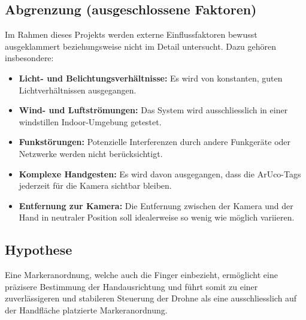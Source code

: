 \subsection{Abgrenzung (ausgeschlossene Faktoren)}
Im Rahmen dieses Projekts werden externe Einflussfaktoren bewusst ausgeklammert beziehungsweise nicht im Detail untersucht.
Dazu gehören insbesondere:
\begin{itemize}
  \item \textbf{Licht- und Belichtungsverhältnisse:} Es wird von konstanten, guten Lichtverhältnissen ausgegangen.
  \item \textbf{Wind- und Luftströmungen:} Das System wird ausschliesslich in einer windstillen Indoor-Umgebung getestet.
  \item \textbf{Funkstörungen:} Potenzielle Interferenzen durch andere Funkgeräte oder Netzwerke werden nicht berücksichtigt.
  \item \textbf{Komplexe Handgesten:} Es wird davon ausgegangen, dass die ArUco-Tags jederzeit für die Kamera sichtbar bleiben.
  \item \textbf{Entfernung zur Kamera:} Die Entfernung zwischen der Kamera und der Hand in neutraler Position soll idealerweise so wenig wie möglich variieren.
\end{itemize}

\subsection{Hypothese}
Eine Markeranordnung, welche auch die Finger einbezieht, ermöglicht eine präzisere Bestimmung der Handausrichtung und führt somit zu einer zuverlässigeren und stabileren Steuerung der Drohne als eine ausschliesslich auf der Handfläche platzierte Markeranordnung.

\endgroup